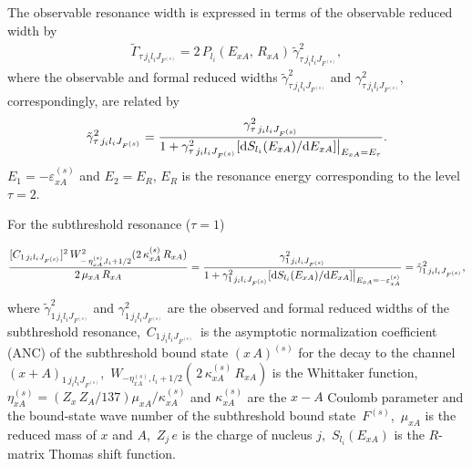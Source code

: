 \documentclass[prl,unsortedaddress,groupedaddress,twocolumn,amsmath,amsfonts,amssymb,showpacs,floatfix,nofootinbib]{revtex4}
\begin{document}
The observable resonance width is expressed in terms of the observable reduced width by
\begin{align}
{\tilde \Gamma}_{\tau\,j_{i}l_{i}J_{F^{(s)}}}=2\,P_{l_{i}}(E_{xA},\,R_{xA})\,{\tilde \gamma}_{\tau\,j_{i}l_{i}J_{F^{(s)}}}^{2},
\label{ObsGammaredwidth1}
\end{align}
where the observable and formal reduced widths ${\tilde \gamma}_{\tau\,j_{i}l_{i}J_{F^{(s)}}}^{2}$ and $\gamma_{\tau\,j_{i}l_{i}J_{F^{(s)}}}^{2}$, correspondingly, are related by
\begin{align}
{\tilde \gamma}_{\tau\,j_{i}l_{i}J_{F^{(s)}}}^{2}= \frac{\gamma_{\tau\,j_{i}l_{i}J_{F^{(s)}}}^{2}   }{ 1+ \gamma_{\tau\,j_{i}l_{i}J_{F^{(s)}}}^{2} [{\rm d}S_{l_{i}}(E_{xA})/{\rm d}E_{xA}] \big|_{E_{xA}= E_{\tau} }}. 
\label{obsformwidth1}
\end{align}
$E_{1} = -\varepsilon_{xA}^{(s)}$ and $E_{2} = E_{R}$, $E_{R}$ is the resonance energy corresponding to the level $\tau=2$.

For the subthreshold resonance ($\tau=1$) \cite{muk99}
\begin{widetext}
\begin{align}
\frac{[C_{1\,j_{i}l_{i}J_{F^{(s)}}}]^{2}\,W_{-\,\eta_{xA}^{(s)},l_{i}+1/2}^{2}(  2\,\kappa_{xA}^{(s)}\,R_{xA}) }{2\,\mu_{xA}\,R_{xA}}=  \frac{   \gamma_{1\,j_{i}l_{i}J_{F^{(s)}}}^{2}   }{ 1+ \gamma_{1\,j_{i}l_{i}J_{F^{(s)}}}^{2} [{\rm d}S_{l_{i}}(E_{xA})/{\rm d}E_{xA}] \big|_{E_{xA}= -\varepsilon_{xA}^{(s)} }} = {\tilde \gamma}_{1\,j_{i}l_{i}J_{F^{(s)}}}^{2},
\label{ANCredwidth1}
\end{align}
 \end{widetext}
where $ {\tilde \gamma}_{1\,j_{i}l_{i}J_{F^{(s)}}}^{2}$ and $\gamma_{1\,j_{i}l_{i}J_{F^{(s)}}}^{2}$ are the observed and formal reduced widths of the subthreshold resonance, $\,C_{1\,j_{i}l_{i}J_{F^{(s)}}}\,$ is the asymptotic normalization coefficient (ANC) of the subthreshold bound state $(x\,A)^{(s)}$ for the decay to the channel $(x+A)_{1\,j_{i}l_{i}J_{F^{(s)}}}$, $\,W_{-\eta_{xA}^{(s)},l_{i}+1/2}(\,2\,\kappa_{xA}^{(s)}\,R_{xA})$ is the Whittaker function, $\eta_{xA}^{(s)}= (Z_{x}\,Z_{A}/137)\mu_{xA}/\kappa_{xA}^{(s)}$  and $\kappa_{xA}^{(s)}$ are the $x-A$ Coulomb parameter and the bound-state wave number of the subthreshold bound state $\,F^{(s)}$, $\,\mu_{xA}$ is the reduced mass of $x$ and $A$, $\,Z_{j}\,e$ is the charge of nucleus $j$, $\,S_{l_{i}}(E_{xA})$ is the $R$-matrix Thomas shift function.
\end{document}
